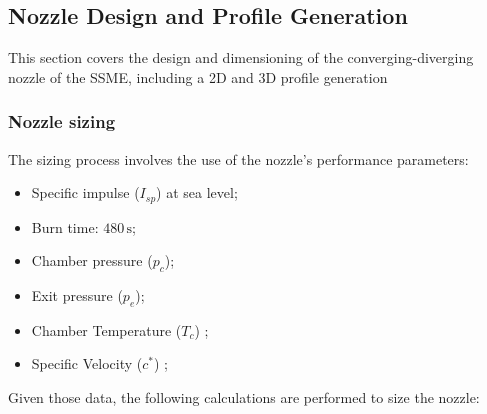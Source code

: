 \subsection{Nozzle Design and Profile Generation}
This section covers the design and dimensioning of the converging-diverging nozzle of the SSME, including a 2D and 3D profile generation
\subsubsection{Nozzle sizing}
The sizing process involves the use of the nozzle's performance parameters:

\begin{itemize}
    \item Specific impulse (\(I_{sp}\)) at sea level;
    \item Burn time: \(480 \, \text{s}\);
    \item Chamber pressure (\(p_c\));
    \item Exit pressure (\(p_e\));
    \item Chamber Temperature (\(T_c\)) ;
    \item Specific Velocity (\(c^*\)) ;

\end{itemize}
Given those data, the following calculations are performed to size the nozzle:
